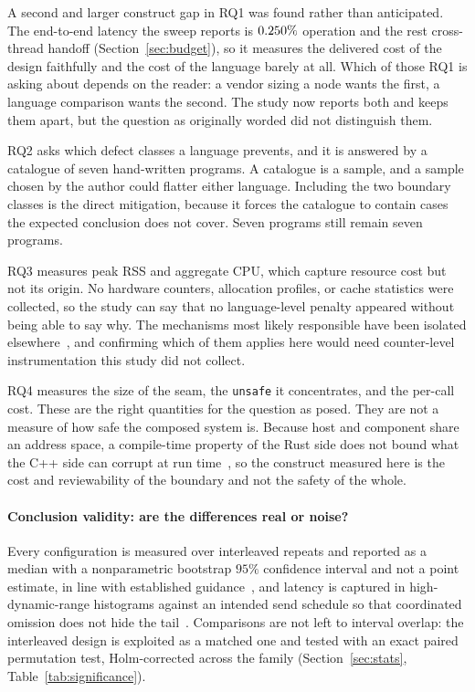 \documentclass[english,twoside,openright,a4paper,censored,csm,software-track-2020]{HYthesisML}
\begin{document}
A second and larger construct gap in RQ1 was found rather than anticipated. The end-to-end
latency the sweep reports is $0.250\%$ operation and the rest cross-thread handoff
(Section~\ref{sec:budget}), so it measures the delivered cost of the design faithfully and the
cost of the language barely at all. Which of those RQ1 is asking about depends on the reader: a
vendor sizing a node wants the first, a language comparison wants the second. The study now
reports both and keeps them apart, but the question as originally worded did not distinguish
them.

RQ2 asks which defect classes a language prevents, and it is answered by a catalogue of seven
hand-written programs. A catalogue is a sample, and a sample chosen by the author could flatter
either language. Including the two boundary classes is the direct mitigation, because it forces
the catalogue to contain cases the expected conclusion does not cover. Seven programs still
remain seven programs.

RQ3 measures peak RSS and aggregate CPU, which capture resource cost but not its origin. No
hardware counters, allocation profiles, or cache statistics were collected, so the study can say
that no language-level penalty appeared without being able to say why. The mechanisms most likely
responsible have been isolated elsewhere~\cite{zhang2022runtime,harris2023morello}, and
confirming which of them applies here would need counter-level instrumentation this study did not
collect.

RQ4 measures the size of the seam, the \texttt{unsafe} it concentrates, and the per-call cost.
These are the right quantities for the question as posed. They are not a measure of how safe the
composed system is. Because host and component share an address space, a compile-time property of
the Rust side does not bound what the C++ side can corrupt at run
time~\cite{rivera2021galeed,kirth2022pkrusafe}, so the construct measured here is the cost and
reviewability of the boundary and not the safety of the whole.

\paragraph{Conclusion validity: are the differences real or noise?}
Every configuration is measured over \NRepeats{} interleaved repeats and reported as a median
with a nonparametric bootstrap $95\%$ confidence interval and not a point estimate, in
line with established guidance~\cite{georges2007rigorous}, and latency is captured in
high-dynamic-range histograms against an intended send schedule so that coordinated omission
does not hide the tail~\cite{tene_hdrhistogram}. Comparisons are not left to interval overlap:
the interleaved design is exploited as a matched one and tested with an exact paired
permutation test, Holm-corrected across the family
(Section~\ref{sec:stats}, Table~\ref{tab:significance}).
\end{document}
